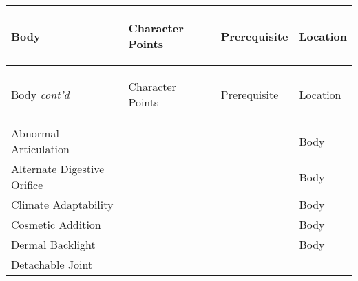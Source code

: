\documentclass[twoside]{book}
\begin{document}
\begin{longtable}{p{1.25in}p{2em}ll} 
  Body
  &
  \begin{turn}{70}{Character Points}\end{turn}
          
  &
  \begin{turn}{70}{Prerequisite}\end{turn}
          
  &
  \begin{turn}{70}{Location}\end{turn}
          
  \\
  \hline
  \hline
  \endfirsthead
  Body \textit{cont'd}
        
  &
  \begin{turn}{70}{Character Points}\end{turn}
          
  &
  \begin{turn}{70}{Prerequisite}\end{turn}
          
  &
  \begin{turn}{70}{Location}\end{turn}
          
  \\
  \hline
  \endhead
      
  \raggedright
           Abnormal Articulation 
  &
  
  &
  
  &
   Body 
  \tabularnewline
      
  \raggedright
           Alternate Digestive Orifice
           
  &
  
  &
  
  &
   Body 
  \tabularnewline
      
  \raggedright
           Climate Adaptability 
  &
  
  &
  
  &
   Body 
  \tabularnewline
      
  \raggedright
           Cosmetic Addition 
  &
  
  &
  
  &
   Body 
  \tabularnewline
      
  \raggedright
           Dermal Backlight 
  &
  
  &
  
  &
   Body 
  \tabularnewline
      
  \raggedright
           Detachable Joint 
  &
  

\end{longtable}
\end{document}
